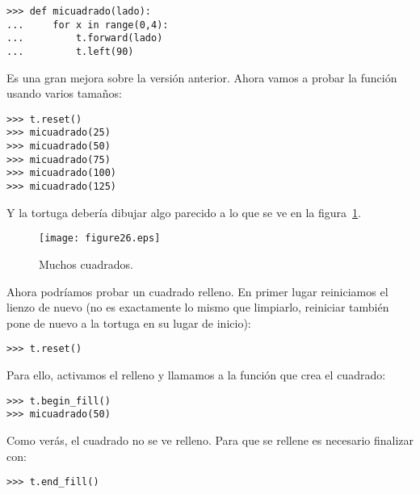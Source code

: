 \begin{listing}
\begin{verbatim}
>>> def micuadrado(lado):
...     for x in range(0,4):
...         t.forward(lado)
...         t.left(90)
\end{verbatim}
\end{listing}

Es una gran mejora sobre la versión anterior. Ahora vamos a probar la función usando varios tamaños:

\begin{listing}
\begin{verbatim}
>>> t.reset()
>>> micuadrado(25)
>>> micuadrado(50)
>>> micuadrado(75)
>>> micuadrado(100)
>>> micuadrado(125)
\end{verbatim}
\end{listing}

Y la tortuga debería dibujar algo parecido a lo que se ve en la figura~\ref{fig26}.

\begin{figure}
\begin{center}
\texttt{[image: figure26.eps]}
\end{center}
\caption{Muchos cuadrados.}\label{fig26}
\end{figure}

\noindent
Ahora podríamos probar un cuadrado relleno.  En primer lugar reiniciamos el lienzo de nuevo (no es exactamente lo mismo que limpiarlo, reiniciar también pone de nuevo a la tortuga en su lugar de inicio):

\begin{listing}
\begin{verbatim}
>>> t.reset()
\end{verbatim}
\end{listing}

\noindent
Para ello, activamos el relleno y llamamos a la función que crea el cuadrado:

\begin{listing}
\begin{verbatim}
>>> t.begin_fill()
>>> micuadrado(50)
\end{verbatim}
\end{listing}

\noindent
Como verás, el cuadrado no se ve relleno. Para que se rellene es necesario finalizar con:

\begin{listing}
\begin{verbatim}
>>> t.end_fill()
\end{verbatim}
\end{listing}

